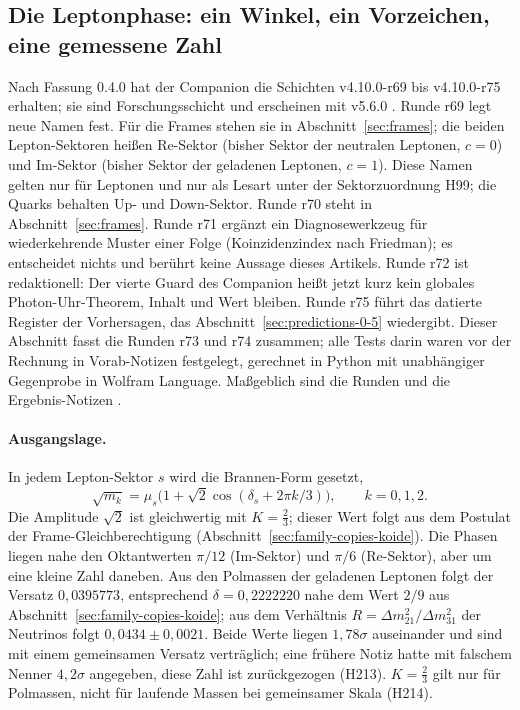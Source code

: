 \subsection{Die Leptonphase: ein Winkel, ein Vorzeichen, eine gemessene Zahl}
\label{sec:lepton-phase}

Nach Fassung 0.4.0 hat der Companion die Schichten v4.10.0-r69 bis v4.10.0-r75 erhalten; sie sind Forschungsschicht und erscheinen mit
v5.6.0 \cite{layersr69r75}. Runde r69 legt neue Namen fest. Für die Frames stehen sie in Abschnitt~\ref{sec:frames}; die beiden
Lepton-Sektoren heißen Re-Sektor (bisher Sektor der neutralen Leptonen, \(c=0\)) und Im-Sektor (bisher Sektor der geladenen Leptonen,
\(c=1\)). Diese Namen gelten nur für Leptonen und nur als Lesart unter der Sektorzuordnung H99; die Quarks behalten Up- und Down-Sektor.
Runde r70 steht in Abschnitt~\ref{sec:frames}. Runde r71 ergänzt ein Diagnosewerkzeug für wiederkehrende Muster einer Folge
(Koinzidenzindex nach Friedman); es entscheidet nichts und berührt keine Aussage dieses Artikels. Runde r72 ist redaktionell: Der vierte
Guard des Companion heißt jetzt kurz \glqq kein globales Photon-Uhr-Theorem\grqq{}, Inhalt und Wert bleiben. Runde r75 führt das datierte
Register der Vorhersagen, das Abschnitt~\ref{sec:predictions-0-5} wiedergibt. Dieser Abschnitt fasst die Runden r73 und r74 zusammen; alle
Tests darin waren vor der Rechnung in Vorab-Notizen festgelegt, gerechnet in Python mit unabhängiger Gegenprobe in Wolfram Language.
Maßgeblich sind die Runden und die Ergebnis-Notizen \cite{leptonphase,phiopen}.

\paragraph{Ausgangslage.}
In jedem Lepton-Sektor \(s\) wird die Brannen-Form gesetzt,
\[
 \sqrt{m_k}=\mu_s\bigl(1+\sqrt2\cos(\delta_s+2\pi k/3)\bigr),\qquad k=0,1,2 .
\]
Die Amplitude \(\sqrt2\) ist gleichwertig mit \(K=\tfrac23\); dieser Wert folgt aus dem Postulat der Frame-Gleichberechtigung
(Abschnitt~\ref{sec:family-copies-koide}). Die Phasen liegen nahe den Oktantwerten \(\pi/12\) (Im-Sektor) und \(\pi/6\) (Re-Sektor), aber um
eine kleine Zahl daneben. Aus den Polmassen der geladenen Leptonen folgt der Versatz \(0{,}0395773\), entsprechend \(\delta=0{,}2222220\) nahe dem
Wert \(2/9\) aus Abschnitt~\ref{sec:family-copies-koide}; aus dem Verhältnis \(R=\Delta m^2_{21}/\Delta m^2_{31}\) der Neutrinos folgt
\(0{,}0434\pm0{,}0021\). Beide Werte liegen \(1{,}78\sigma\) auseinander und sind mit einem gemeinsamen Versatz verträglich; eine frühere Notiz
hatte mit falschem Nenner \(4{,}2\sigma\) angegeben, diese Zahl ist zurückgezogen (H213). \(K=\tfrac23\) gilt nur für Polmassen, nicht für
laufende Massen bei gemeinsamer Skala (H214).


